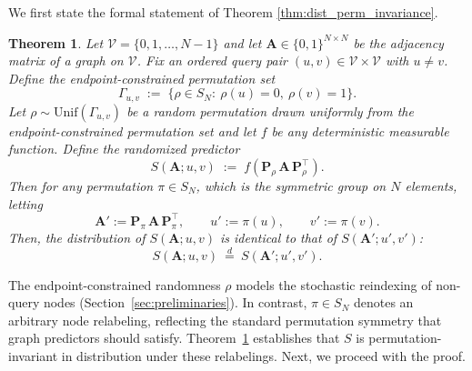 \documentclass{article}
\theoremstyle{plain}
\newtheorem{theorem}{Theorem}[section]
\theoremstyle{definition}
\theoremstyle{remark}
\begin{document}
We first state the formal statement of Theorem \ref{thm:dist_perm_invariance}.

\begin{theorem}
    \label{thm:dist_perm_invariance_single_f}
    Let $\mathcal{V}=\{0,1,\dots,N-1\}$ and let $\mathbf{A}\in\{0,1\}^{N\times N}$ be the adjacency matrix of a graph on $\mathcal{V}$.
    Fix an ordered query pair $(u,v)\in \mathcal{V}\times \mathcal{V}$ with $u\neq v$.
    Define the endpoint-constrained permutation set
    \[
    \Gamma_{u,v} \;:=\; \{\rho\in S_N:\ \rho(u)=0,\ \rho(v)=1\}.
    \]
    Let $\rho \sim \mathrm{Unif}(\Gamma_{u,v})$ be a random permutation drawn uniformly from the endpoint-constrained permutation set and let $f$ be any deterministic measurable function.
    Define the randomized predictor
    \[
    S(\mathbf{A};u,v) \;:=\; f\!\left(\mathbf{P}_\rho\, \mathbf{A}\, \mathbf{P}_\rho^\top\right).
    \]
    Then for any permutation $\pi\in S_N$, which is the symmetric group on $N$ elements, letting
    \[
    \mathbf{A}' := \mathbf{P}_\pi\, \mathbf{A}\, \mathbf{P}_\pi^\top,\qquad u' := \pi(u),\qquad v' := \pi(v).
    \]
    Then, the distribution of $S(\mathbf{A};u,v)$ is identical to that of $S(\mathbf{A}';u',v')$:
    \[
    S(\mathbf{A};u,v)\ \overset{d}{=}\ S(\mathbf{A}';u',v').
    \]
\end{theorem}

The endpoint-constrained randomness $\rho$ models the stochastic reindexing of non-query nodes (Section~\ref{sec:preliminaries}). In contrast, $\pi \in S_N$ denotes an arbitrary node relabeling, reflecting the standard permutation symmetry that graph predictors should satisfy. Theorem~\ref{thm:dist_perm_invariance_single_f} establishes that $S$ is permutation-invariant in distribution under these relabelings. Next, we proceed with the proof.
\end{document}
